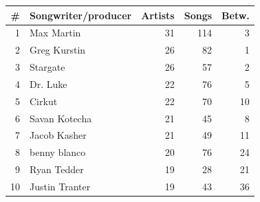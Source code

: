 \begin{tabular}{rlrrr}
\# & Songwriter/producer & Artists & Songs & Betw. \\
\midrule
1 & Max Martin & 31 & 114 & 3 \\
2 & Greg Kurstin & 26 & 82 & 1 \\
3 & Stargate & 26 & 57 & 2 \\
4 & Dr. Luke & 22 & 76 & 5 \\
5 & Cirkut & 22 & 70 & 10 \\
6 & Savan Kotecha & 21 & 45 & 8 \\
7 & Jacob Kasher & 21 & 49 & 11 \\
8 & benny blanco & 20 & 76 & 24 \\
9 & Ryan Tedder & 19 & 28 & 21 \\
10 & Justin Tranter & 19 & 43 & 36 \\
\bottomrule
\end{tabular}
